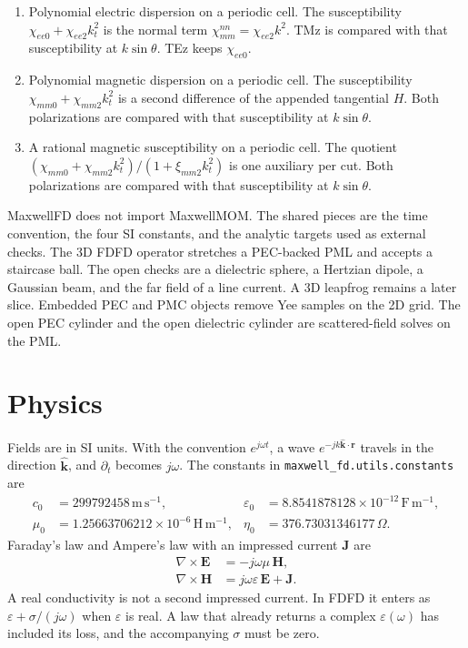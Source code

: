 \documentclass[11pt,a4paper]{article}
\begin{document}
\begin{enumerate}
the ends and the junction. The left piece is the normal-incidence
absorber and the right piece is $\chi_{ee}=0.5$, $\chi_{mm}=0.25$.
The $10\lambda$ run of that sheet is the open example.
\item Polynomial electric dispersion on a periodic cell. The
susceptibility $\chi_{ee0}+\chi_{ee2}k_t^2$ is the normal term
$\chi_{mm}^{nn}=\chi_{ee2}k^2$. TMz is compared with that
susceptibility at $k\sin\theta$. TEz keeps $\chi_{ee0}$.
\item Polynomial magnetic dispersion on a periodic cell. The
susceptibility $\chi_{mm0}+\chi_{mm2}k_t^2$ is a second difference
of the appended tangential $H$. Both polarizations are compared
with that susceptibility at $k\sin\theta$.
\item A rational magnetic susceptibility on a periodic cell. The
quotient $(\chi_{mm0}+\chi_{mm2}k_t^2)/(1+\xi_{mm2}k_t^2)$ is one
auxiliary per cut. Both polarizations are compared with that
susceptibility at $k\sin\theta$.
\end{enumerate}

MaxwellFD does not import MaxwellMOM. The shared pieces are the time
convention, the four SI constants, and the analytic targets used as
external checks. The 3D FDFD operator stretches a PEC-backed PML and
accepts a staircase ball. The open checks are a dielectric sphere, a Hertzian dipole, a Gaussian beam, and the far field of a line current. A 3D
leapfrog remains a later slice. Embedded PEC and PMC objects remove Yee
samples on the 2D grid. The open PEC cylinder and the open dielectric
cylinder are scattered-field solves on the PML.

\section{Physics}
\label{sec:physics}

Fields are in SI units. With the convention $e^{j\omega t}$, a wave
$e^{-jk\hat{\mathbf{k}}\cdot\mathbf{r}}$ travels in the direction
$\hat{\mathbf{k}}$, and $\partial_t$ becomes $j\omega$. The constants in
\texttt{maxwell\_fd.utils.constants} are
\begin{align*}
c_0 &= 299792458\,\mathrm{m\,s^{-1}},&
\varepsilon_0 &= 8.8541878128\times 10^{-12}\,\mathrm{F\,m^{-1}},\\
\mu_0 &= 1.25663706212\times 10^{-6}\,\mathrm{H\,m^{-1}},&
\eta_0 &= 376.73031346177\,\Omega.
\end{align*}
Faraday's law and Ampere's law with an impressed current $\mathbf{J}$ are
\begin{align}
\nabla\times\mathbf{E} &= -j\omega\mu\,\mathbf{H}, \label{eq:faraday}\\
\nabla\times\mathbf{H} &= j\omega\varepsilon\,\mathbf{E}+\mathbf{J}.
\label{eq:ampere}
\end{align}
A real conductivity is not a second impressed current. In FDFD it enters as
$\varepsilon+\sigma/(j\omega)$ when $\varepsilon$ is real. A law that
already returns a complex $\varepsilon(\omega)$ has included its loss, and
the accompanying $\sigma$ must be zero.
\end{document}
